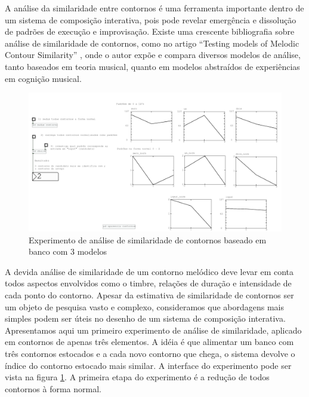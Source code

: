 \documentclass[draft]{ppgmus}
\begin{document}
A análise da similaridade entre contornos é uma ferramenta importante dentro
 de um sistema de composição interativa, pois pode revelar emergência e dissolução de 
padrões de execução e improvisação. 
Existe uma crescente bibliografia sobre análise de similaridade de contornos,
como no artigo ``Testing models of Melodic Contour Similarity'' \cite{schmuckler}, onde o autor expõe e compara diversos modelos de análise,
tanto baseados em teoria musical, quanto em modelos abstraídos de experiências
em cognição musical.

\begin{figure}
\includegraphics[scale=.4]{similaridade-interface}
\caption{Experimento de análise de similaridade de contornos baseado em banco com 3 modelos}
\label{similaridade-interface}
\end{figure}

A devida análise de similaridade de um contorno melódico deve levar em conta todos
aspectos envolvidos como o timbre, relações de duração e intensidade de cada ponto do contorno.
Apesar da estimativa de similaridade de contornos ser um objeto de pesquisa vasto e complexo, 
consideramos que abordagens
mais simples podem ser úteis no desenho de um sistema de composição interativa.
Apresentamos aqui um primeiro experimento de análise de similaridade, aplicado em
contornos de apenas três elementos. A idéia é que alimentar um banco com três contornos estocados e a cada
novo contorno que chega, o sistema devolve o índice do contorno estocado mais similar.
A interface do experimento pode ser vista na figura \ref{similaridade-interface}.
A primeira etapa do experimento é a redução de todos contornos à forma normal.
\end{document}
